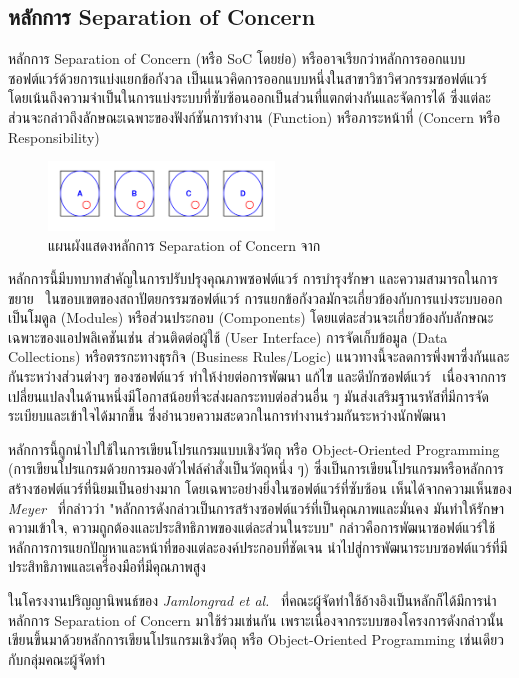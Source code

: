 \documentclass[12pt,one side,openright,a4paper]{cpe-thesis-th}
\newcommand{\thaijustify}[1]{%
  \par\hspace{30pt}\justifying
  #1
}
\begin{document}
\subsection{หลักการ Separation of Concern}
\thaijustify{
  หลักการ Separation of Concern (หรือ SoC โดยย่อ) หรืออาจเรียกว่าหลักการออกแบบซอฟต์แวร์ด้วยการแบ่งแยกข้อกังวล เป็นแนวคิดการออกแบบหนึ่งในสาขาวิชาวิศวกรรมซอฟต์แวร์ โดยเน้นถึงความจำเป็นในการแบ่งระบบที่ซับซ้อนออกเป็นส่วนที่แตกต่างกันและจัดการได้ ซึ่งแต่ละส่วนจะกล่าวถึงลักษณะเฉพาะของฟังก์ชันการทำงาน (Function) หรือภาระหน้าที่ (Concern หรือ Responsibility)~\cite{nattawat20pgs}
}
\begin{figure}[H]
  \centering
  \includegraphics[width=6cm]{figure/literature/soc.png}
  \caption[แผนผังแสดงหลักการ Separation of Concern]{แผนผังแสดงหลักการ Separation of Concern จาก~\cite{wikipedia04soc}}
  \label{fig:soc-general}
\end{figure}
\thaijustify{
  หลักการนี้มีบทบาทสำคัญในการปรับปรุงคุณภาพซอฟต์แวร์ การบำรุงรักษา และความสามารถในการขยาย~\cite{dijkstra82} ในขอบเขตของสถาปัตยกรรมซอฟต์แวร์ การแยกข้อกังวลมักจะเกี่ยวข้องกับการแบ่งระบบออกเป็นโมดูล (Modules) หรือส่วนประกอบ (Components) โดยแต่ละส่วนจะเกี่ยวข้องกับลักษณะเฉพาะของแอปพลิเคชันเช่น ส่วนติดต่อผู้ใช้ (User Interface) การจัดเก็บข้อมูล (Data Collections) หรือตรรกะทางธุรกิจ (Business Rules/Logic) แนวทางนี้จะลดการพึ่งพาซึ่งกันและกันระหว่างส่วนต่างๆ ของซอฟต์แวร์ ทำให้ง่ายต่อการพัฒนา แก้ไข และดีบักซอฟต์แวร์~\cite{wikipedia04soc} เนื่องจากการเปลี่ยนแปลงในด้านหนึ่งมีโอกาสน้อยที่จะส่งผลกระทบต่อส่วนอื่น ๆ มันส่งเสริมฐานรหัสที่มีการจัดระเบียบและเข้าใจได้มากขึ้น ซึ่งอำนวยความสะดวกในการทำงานร่วมกันระหว่างนักพัฒนา
}
\thaijustify{
  หลักการนี้ถูกนำไปใช้ในการเขียนโปรแกรมแบบเชิงวัตถุ หรือ Object-Oriented Programming (การเขียนโปรแกรมด้วยการมองตัวไฟล์คำสั่งเป็นวัตถุหนึ่ง ๆ) ซึ่งเป็นการเขียนโปรแกรมหรือหลักการสร้างซอฟต์แวร์ที่นิยมเป็นอย่างมาก โดยเฉพาะอย่างยิ่งในซอฟต์แวร์ที่ซับซ้อน เห็นได้จากความเห็นของ \textit{Meyer}~\cite{meyer2000} ที่กล่าวว่า "หลักการดังกล่าวเป็นการสร้างซอฟต์แวร์ที่เป็นคุณภาพและมั่นคง มันทำให้รักษาความเข้าใจ, ความถูกต้องและประสิทธิภาพของแต่ละส่วนในระบบ" กล่าวคือการพัฒนาซอฟต์แวร์ใช้หลักการการแยกปัญหาและหน้าที่ของแต่ละองค์ประกอบที่ชัดเจน นำไปสู่การพัฒนาระบบซอฟต์แวร์ที่มีประสิทธิภาพและเครื่องมือที่มีคุณภาพสูง
}
\thaijustify{
  ในโครงงานปริญญานิพนธ์ของ \textit{Jamlongrad et al.}~\cite{nattawat20pgs} ที่คณะผู้จัดทำใช้อ้างอิงเป็นหลักก็ได้มีการนำหลักการ Separation of Concern มาใช้ร่วมเช่นกัน เพราะเนื่องจากระบบของโครงการดังกล่าวนั้น เขียนขึ้นมาด้วยหลักการเขียนโปรแกรมเชิงวัตถุ หรือ Object-Oriented Programming เช่นเดียวกับกลุ่มคณะผู้จัดทำ
}
\end{document}
